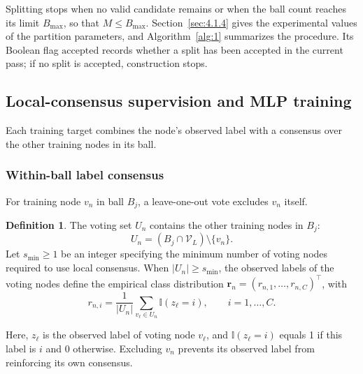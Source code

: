 \documentclass[times,review,10pt]{elsarticle}
\theoremstyle{definition}
\newtheorem{definition}{Definition}
\theoremstyle{plain}
\begin{document}
Splitting stops when no valid candidate remains or when the ball count reaches its limit \(B_{\max}\), so that \(M\leq B_{\max}\). Section~\ref{sec:4.1.4} gives the experimental values of the partition parameters, and Algorithm~\ref{alg:1} summarizes the procedure. Its Boolean flag \(\mathrm{accepted}\) records whether a split has been accepted in the current pass; if no split is accepted, construction stops.



\subsection{Local-consensus supervision and MLP training}\label{sec:3.3}

Each training target combines the node's observed label with a consensus over the other training nodes in its ball.

\subsubsection{Within-ball label consensus}\label{sec:3.3.1}

For training node \(v_n\) in ball \(B_j\), a leave-one-out vote excludes \(v_n\) itself.

\begin{definition}
The voting set \(U_n\) contains the other training nodes in \(B_j\):
\begin{equation}\label{eq:7}
U_n=(B_j\cap\mathcal V_L)\setminus\{v_n\}.
\end{equation}
Let \(s_{\min}\geq1\) be an integer specifying the minimum number of voting nodes required to use local consensus. When \(|U_n|\geq s_{\min}\), the observed labels of the voting nodes define the empirical class distribution \(\mathbf r_n=(r_{n,1},\ldots,r_{n,C})^\top\), with
\begin{equation}\label{eq:8}
r_{n,i}=\frac{1}{|U_n|}\sum_{v_\ell\in U_n}\mathbb I(z_\ell=i),
\qquad i=1,\ldots,C.
\end{equation}
\end{definition}

Here, \(z_\ell\) is the observed label of voting node \(v_\ell\), and \(\mathbb I(z_\ell=i)\) equals 1 if this label is \(i\) and 0 otherwise. Excluding \(v_n\) prevents its observed label from reinforcing its own consensus.
\end{document}
